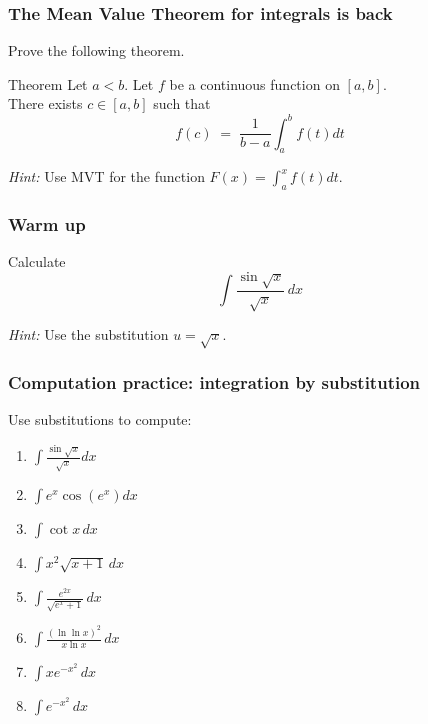 \documentclass[14pt]{beamer}
\begin{document}
\begin{frame}[t]
	\fontsize{13}{13}\selectfont
	\frametitle{The Mean Value Theorem for integrals is back}

	Prove the following theorem.

	\begin{block}{\fontsize{13}{13}\selectfont Theorem}
		Let $a < b$. Let $f$ be a continuous function on $[a,b]$. \\ There exists $c
		\in [a,b]$ such that
		\vspace{-.5cm}
		\[
			f(c) \; = \; \frac{1}{b-a}\int_{a}^{b}f(t) dt
		\]
	\end{block}


	\emph{Hint:} Use MVT for the function
	$\displaystyle F(x) = \int_{a}^{x}f(t) dt$.
\end{frame}

\begin{frame}[t]
	\frametitle{Warm up}

	Calculate
	\[
		\int \frac{\sin \sqrt{x}}{\sqrt{x}}\, dx
	\]

	\emph{Hint:} Use the substitution $\displaystyle u=\sqrt{x}$.
\end{frame}

\begin{frame}[t]
	\frametitle{Computation practice: integration by substitution}

	Use substitutions to compute:
	\begin{multicols}{2}
		\begin{enumerate}
			\item $\displaystyle \int \frac{\sin \sqrt{x}}{\sqrt{x}}dx$
				\vspace{.2cm}

			\item $\displaystyle \int e^{x}\cos \left(e^{x}\right) dx$
				\vspace{.2cm}

			\item $\displaystyle \int \cot x \, dx$
				\vspace{.2cm}

			\item $\displaystyle \int x^{2}\sqrt{x+1}\, dx$
				\vspace{.2cm}

			\item $\displaystyle \int \frac{e^{2x}}{\sqrt{e^{x}+ 1}}\, dx$
				\vspace{.2cm}

			\item $\displaystyle \int \frac{\left( \ln \ln x \right)^{2}}{ x \ln x}\, d
				x$
				\vspace{.2cm}

			\item $\displaystyle \int x e^{-x^2}\, dx$
				\vspace{.2cm}

			\item $\displaystyle \int e^{-x^2}\, dx$
				\vspace{.2cm}
		\end{enumerate}
	\end{multicols}
\end{frame}
\end{document}

